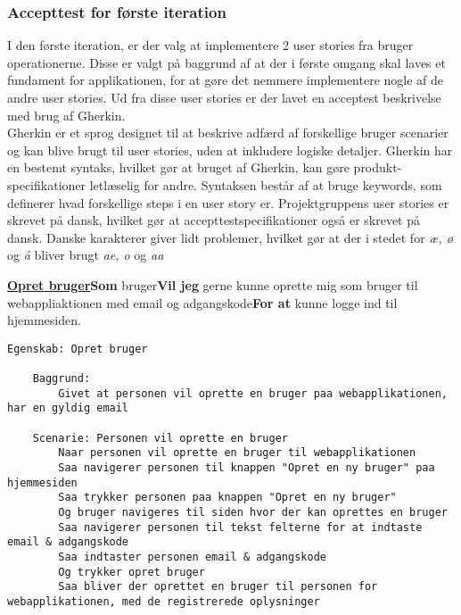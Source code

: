 \subsubsection{Accepttest for første iteration}
\noindent I den første iteration, er der valg at implementere 2 user stories fra bruger operationerne. Disse er valgt på baggrund af at der i første omgang skal laves et fundament for applikationen, for at gøre det nemmere implementere nogle af de andre user stories. Ud fra disse user stories er der lavet en acceptest beskrivelse med brug af Gherkin\cite{gherkin}.\\
Gherkin er et sprog designet til at beskrive adfærd af forskellige bruger scenarier og kan blive brugt til user stories, uden at inkludere logiske detaljer. Gherkin har en bestemt syntaks, hvilket gør at bruget af Gherkin, kan gøre produkt-specifikationer letlæselig for andre. Syntaksen består af at bruge keywords, som definerer hvad forskellige steps i en user story er. Projektgruppens user stories er skrevet på dansk, hvilket gør at accepttestspecifikationer også er skrevet på dansk. Danske karakterer giver lidt problemer, hvilket gør at der i stedet for \textit{æ, ø} og \textit{å} bliver brugt \textit{ae, o} og \textit{aa} \newline 

\noindent \textbf{\underline{Opret bruger}}\newline \textbf{Som} bruger\newline \textbf{Vil jeg} gerne kunne oprette mig som bruger til webappliaktionen med email og adgangskode\newline \textbf{For at} kunne logge ind til hjemmesiden. 

\begin{lstlisting}[language=Gherkin]
Egenskab: Opret bruger
    
    Baggrund:
        Givet at personen vil oprette en bruger paa webapplikationen, har en gyldig email
        
	Scenarie: Personen vil oprette en bruger
		Naar personen vil oprette en bruger til webapplikationen
		Saa navigerer personen til knappen "Opret en ny bruger" paa hjemmesiden
		Saa trykker personen paa knappen "Opret en ny bruger"
		Og bruger navigeres til siden hvor der kan oprettes en bruger
		Saa navigerer personen til tekst felterne for at indtaste email & adgangskode
		Saa indtaster personen email & adgangskode
		Og trykker opret bruger
		Saa bliver der oprettet en bruger til personen for webapplikationen, med de registrerede oplysninger
\end{lstlisting}

